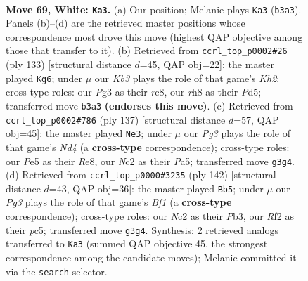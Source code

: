 \documentclass[11pt]{article}
\begin{document}
\clearpage

\begin{figure}[p]\centering
\begin{subfigure}{0.46\textwidth}\centering
\resizebox{\linewidth}{!}{%
\newchessgame
\chessboard[
  setfen={1r5r/pn4k1/1p2p3/4P2p/2P5/1K4PR/P1NB1R2/8 w - - 9 69},
  showmover=false,
  pgfstyle=straightmove, color=movearrow, markmove={b3-a3}
]}
\caption{}
\end{subfigure}\hfill
\begin{subfigure}{0.46\textwidth}\centering
\resizebox{\linewidth}{!}{%
\newchessgame
\chessboard[
  setfen={2R5/2R2p1k/5P1p/1r1pp1p1/1P4P1/2K4P/r7/8 b - - 8 67},
  showmover=false,
  pgfstyle=straightmove, color=movearrow, markmove={h7-g6}
]}
\caption{}
\end{subfigure}
\\[4pt]
\begin{subfigure}{0.46\textwidth}\centering
\resizebox{\linewidth}{!}{%
\newchessgame
\chessboard[
  setfen={4r3/6r1/2k5/p1pn2P1/P2p4/7P/3N1R1K/6R1 b - - 0 69},
  showmover=false,
  pgfstyle=straightmove, color=movearrow, markmove={d5-e3}
]}
\caption{}
\end{subfigure}\hfill
\begin{subfigure}{0.46\textwidth}\centering
\resizebox{\linewidth}{!}{%
\newchessgame
\chessboard[
  setfen={R3n1k1/5p2/6pp/2prr3/7P/1P4P1/3p1P1K/3R1B2 w - - 0 72},
  showmover=false,
  pgfstyle=straightmove, color=movearrow, markmove={f1-b5}
]}
\caption{}
\end{subfigure}
\caption{\textbf{Move 69, White: \texttt{Ka3}.} (a) Our position; Melanie plays \texttt{Ka3} (\texttt{b3a3}). Panels (b)--(d) are the retrieved master positions whose correspondence most drove this move (highest QAP objective among those that transfer to it). (b) Retrieved from \texttt{ccrl\_top\_p0002\#26} (ply 133) [structural distance $d$=45, QAP obj=22]: the master played \texttt{Kg6}; under $\mu$ our \emph{Kb3} plays the role of that game's \emph{Kh2}; cross-type roles: our \emph{P}g3 as their \emph{r}c8, our \emph{r}h8 as their \emph{P}d5; transferred move \texttt{b3a3} \textbf{(endorses this move)}. (c) Retrieved from \texttt{ccrl\_top\_p0002\#786} (ply 137) [structural distance $d$=57, QAP obj=45]: the master played \texttt{Ne3}; under $\mu$ our \emph{Pg3} plays the role of that game's \emph{Nd4} (a \textbf{cross-type} correspondence); cross-type roles: our \emph{P}e5 as their \emph{R}e8, our \emph{N}c2 as their \emph{P}a5; transferred move \texttt{g3g4}. (d) Retrieved from \texttt{ccrl\_top\_p0000\#3235} (ply 142) [structural distance $d$=43, QAP obj=36]: the master played \texttt{Bb5}; under $\mu$ our \emph{Pg3} plays the role of that game's \emph{Bf1} (a \textbf{cross-type} correspondence); cross-type roles: our \emph{N}c2 as their \emph{P}b3, our \emph{R}f2 as their \emph{p}c5; transferred move \texttt{g3g4}. Synthesis: 2 retrieved analogs transferred to \texttt{Ka3} (summed QAP objective 45, the strongest correspondence among the candidate moves); Melanie committed it via the \texttt{search} selector.}
\label{fig:thought-m136}
\end{figure}
\end{document}
